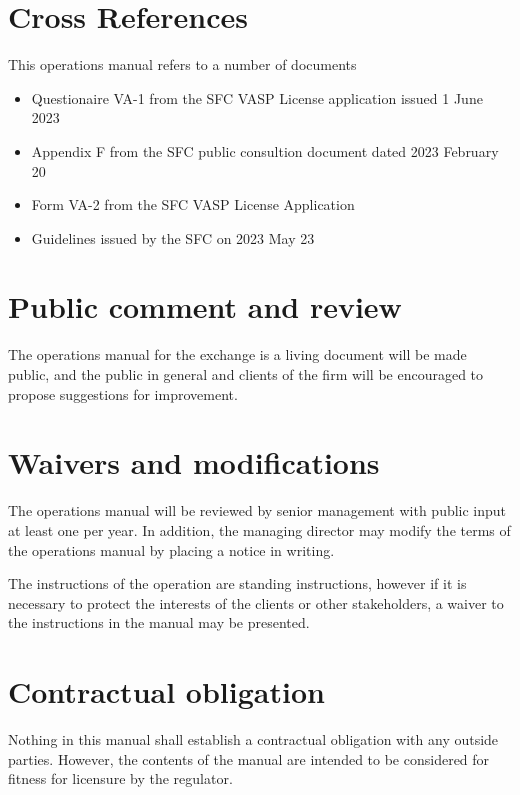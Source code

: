 \section{Cross References}
This operations manual refers to a number of documents
\begin{itemize}
  \item Questionaire VA-1 from the SFC VASP License application
    issued 1 June 2023
  \item Appendix F from the SFC public consultion document dated
    2023 February 20
  \item Form VA-2 from the SFC VASP License Application
  \item Guidelines issued by the SFC on 2023 May 23
\end{itemize}

\section{Public comment and review}
The operations manual for the exchange is a living document will be
made public, and the public in general and clients of the firm will be
encouraged to propose suggestions for improvement.

\section{Waivers and modifications}
The operations manual will be reviewed by senior management with
public input at least one per year.  In addition, the managing
director may modify the terms of the operations manual by placing a
notice in writing.

The instructions of the operation are standing instructions, however
if it is necessary to protect the interests of the
clients or other stakeholders, a waiver to the instructions in the
manual may be presented.

\section{Contractual obligation}
Nothing in this manual shall establish a contractual obligation with
any outside parties.  However, the contents of the manual are intended
to be considered for fitness for licensure by the regulator.

